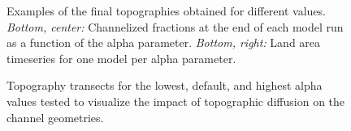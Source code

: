 \begin{figure}
	\caption{Examples of the final topographies obtained for different values. \textit{Bottom, center:} Channelized fractions at the end of each model run as a function of the alpha parameter. \textit{Bottom, right:} Land area timeseries for one model per alpha parameter.}
	\label{fig:alpha_topos}
\end{figure}

\begin{figure}
	\caption{Topography transects for the lowest, default, and highest alpha values tested to visualize the impact of topographic diffusion on the channel geometries.}
	\label{fig:alpha_transect}
\end{figure}

